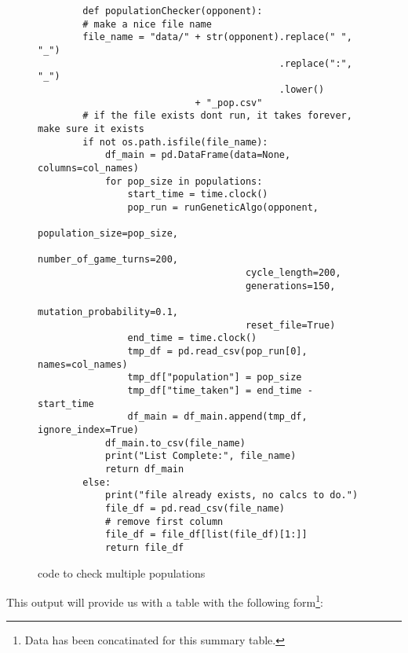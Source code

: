 \begin{figure}
    \begin{verbatim}
        def populationChecker(opponent):
        # make a nice file name
        file_name = "data/" + str(opponent).replace(" ", "_")
                                           .replace(":", "_")
                                           .lower() 
                            + "_pop.csv"
        # if the file exists dont run, it takes forever, make sure it exists 
        if not os.path.isfile(file_name):
            df_main = pd.DataFrame(data=None, columns=col_names)
            for pop_size in populations:
                start_time = time.clock()
                pop_run = runGeneticAlgo(opponent,
                                     population_size=pop_size,
                                     number_of_game_turns=200,
                                     cycle_length=200,
                                     generations=150,
                                     mutation_probability=0.1,
                                     reset_file=True)
                end_time = time.clock()
                tmp_df = pd.read_csv(pop_run[0], names=col_names)
                tmp_df["population"] = pop_size
                tmp_df["time_taken"] = end_time - start_time
                df_main = df_main.append(tmp_df, ignore_index=True)
            df_main.to_csv(file_name)
            print("List Complete:", file_name)
            return df_main
        else:
            print("file already exists, no calcs to do.")
            file_df = pd.read_csv(file_name)
            # remove first column
            file_df = file_df[list(file_df)[1:]]
            return file_df
    \end{verbatim}
    \label{code:populationChecker}
    \caption{code to check multiple populations}    
\end{figure}
This output will provide us with a table with the following form\footnote{Data has been concatinated for this summary table.}:

